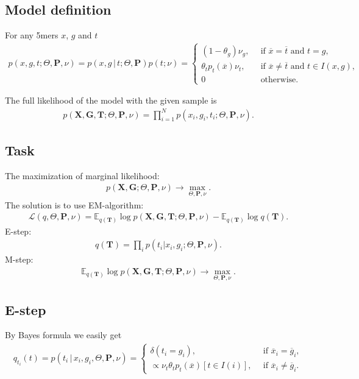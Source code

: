 \documentclass[10pt]{article}
\begin{document}
\subsection{Model definition}
For any 5mers $x$, $g$ and $t$
\begin{gather}
    p(x, g, t; \Theta, \mathbf P, \nu) = p(x, g \,|\, t; \Theta, \mathbf P) p(t; \nu) =
    \begin{cases}
        (1 - \theta_g) \nu_g, \, & \mbox{ if $\overline x = \overline t$ and $t = g$}, \\
        \theta_tp_t(\overline x) \nu_t, \, & \mbox{ if $\overline x \neq \overline t$ and $t \in I(x, g)$},\\
        0 \, & \mbox{ otherwise}.
    \end{cases}
\end{gather}

The full likelihood of the model with the given sample is
\begin{gather}
    p(\mathbf X, \mathbf G, \mathbf T; \Theta, \mathbf P, \nu) = 
    \prod_{i=1}^N p(x_i, g_i, t_i; \Theta, \mathbf P, \nu).
\end{gather}

\subsection{Task}

The maximization of marginal likelihood:
\begin{gather}
    p(\mathbf X, \mathbf G; \Theta, \mathbf P, \nu) \to \max_{\Theta, \mathbf P, \nu}.
\end{gather}
The solution is to use EM-algorithm:
\begin{gather}
    \mathcal L(q, \Theta, \mathbf P, \nu) = 
    \mathbb E_{q(\mathbf T)} \log p(\mathbf X, \mathbf G, \mathbf T; \Theta, \mathbf P, \nu) -
    \mathbb E_{q(\mathbf T)} \log q(\mathbf T).
\end{gather}
E-step:
\begin{gather}
    q(\mathbf T) = \prod_i p(t_i | x_i, g_i; \Theta, \mathbf P, \nu).
\end{gather}
M-step:
\begin{gather}
    \mathbb E_{q(\mathbf T)} \log p(\mathbf X, \mathbf G, \mathbf T; \Theta, \mathbf P, \nu) \to 
    \max_{\Theta, \mathbf P, \nu}.
\end{gather}

\subsection{E-step}
By Bayes formula we easily get
\begin{gather}
    q_{t_i}(t) = p(t_i \, | \, x_i, g_i, \Theta, \mathbf P, \nu) =
    \begin{cases}
        \delta(t_i = g_i), \, & \mbox{ if $\overline x_i = \overline g_i$}, \\
        \propto \nu_t \theta_t p_t(\overline x) [t \in I(i)], \, & 
        \mbox{ if $\overline x_i \neq \overline g_i$}.
    \end{cases}
\end{gather}
\end{document}

